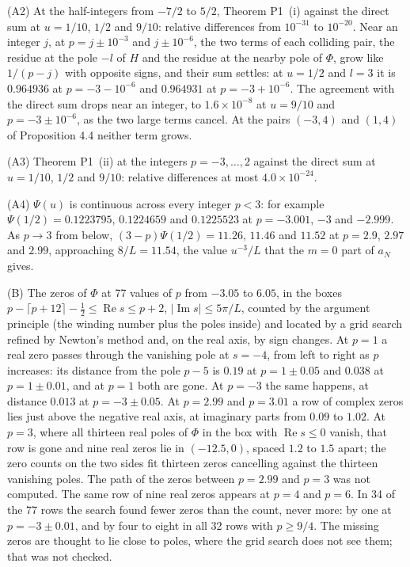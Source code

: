 \documentclass[11pt]{article}
\newcommand{\re}{\operatorname{Re}}
\newcommand{\im}{\operatorname{Im}}
\begin{document}
(A2) At the half-integers from $-7/2$ to $5/2$, Theorem P1~(i) against the direct sum at $u=1/10$, $1/2$ and $9/10$: relative differences from $10^{-31}$ to $10^{-20}$. Near an integer $j$, at $p=j\pm10^{-3}$ and $j\pm10^{-6}$, the two terms of each colliding pair, the residue at the pole $-l$ of $H$ and the residue at the nearby pole of $\Phi$, grow like $1/(p-j)$ with opposite signs, and their sum settles: at $u=1/2$ and $l=3$ it is $0.964936$ at $p=-3-10^{-6}$ and $0.964931$ at $p=-3+10^{-6}$. The agreement with the direct sum drops near an integer, to $1.6\times10^{-8}$ at $u=9/10$ and $p=-3\pm10^{-6}$, as the two large terms cancel. At the pairs $(-3,4)$ and $(1,4)$ of Proposition 4.4 neither term grows.

(A3) Theorem P1~(ii) at the integers $p=-3,\dots,2$ against the direct sum at $u=1/10$, $1/2$ and $9/10$: relative differences at most $4.0\times10^{-24}$.

(A4) $\Psi(u)$ is continuous across every integer $p<3$: for example $\Psi(1/2)=0.1223795$, $0.1224659$ and $0.1225523$ at $p=-3.001$, $-3$ and $-2.999$. As $p\to3$ from below, $(3-p)\Psi(1/2)=11.26$, $11.46$ and $11.52$ at $p=2.9$, $2.97$ and $2.99$, approaching $8/L=11.54$, the value $u^{-3}/L$ that the $m=0$ part of $a_N$ gives.

(B) The zeros of $\Phi$ at 77 values of $p$ from $-3.05$ to $6.05$, in the boxes $p-\lceil p+12\rceil-\frac12\le\re s\le p+2$, $|\im s|\le5\pi/L$, counted by the argument principle (the winding number plus the poles inside) and located by a grid search refined by Newton's method and, on the real axis, by sign changes. At $p=1$ a real zero passes through the vanishing pole at $s=-4$, from left to right as $p$ increases: its distance from the pole $p-5$ is $0.19$ at $p=1\pm0.05$ and $0.038$ at $p=1\pm0.01$, and at $p=1$ both are gone. At $p=-3$ the same happens, at distance $0.013$ at $p=-3\pm0.05$. At $p=2.99$ and $p=3.01$ a row of complex zeros lies just above the negative real axis, at imaginary parts from $0.09$ to $1.02$. At $p=3$, where all thirteen real poles of $\Phi$ in the box with $\re s\le0$ vanish, that row is gone and nine real zeros lie in $(-12.5,0)$, spaced $1.2$ to $1.5$ apart; the zero counts on the two sides fit thirteen zeros cancelling against the thirteen vanishing poles. The path of the zeros between $p=2.99$ and $p=3$ was not computed. The same row of nine real zeros appears at $p=4$ and $p=6$. In 34 of the 77 rows the search found fewer zeros than the count, never more: by one at $p=-3\pm0.01$, and by four to eight in all 32 rows with $p\ge9/4$. The missing zeros are thought to lie close to poles, where the grid search does not see them; that was not checked.
\end{document}
